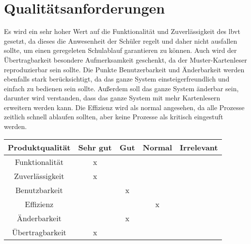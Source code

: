 \section{Qualitätsanforderungen}
Es wird ein sehr hoher Wert auf die Funktionalität und Zuverlässigkeit des \gls{lbvt} gesetzt, da dieses die Anwesenheit der Schüler regelt und daher nicht ausfallen sollte, um einen geregeleten Schulablauf garantieren zu können. Auch wird der Übertragbarkeit besondere Aufmerksamkeit geschenkt, da der Muster-Kartenleser reproduzierbar sein sollte. Die Punkte Benutzerbarkeit und Änderbarkeit werden ebenfalls stark berücksichtigt, da das ganze System einsteigerfreundlich und einfach zu bedienen sein sollte. Außerdem soll das ganze System änderbar sein, darunter wird verstanden, dass das ganze System mit mehr Kartenlesern erweitern werden kann. Die Effizienz wird als normal angesehen, da alle Prozesse zeitlich schnell ablaufen sollten, aber keine Prozesse als kritisch eingestuft werden. 

\begin{center}

\begin{tabular}{|c|c|c|c|c|}

\hline
    \rowcolor{gray} \textbf{\color{white}Produktqualität}&\textbf{\color{white}Sehr gut}&\textbf{\color{white}Gut}&\textbf{\color{white}Normal}&\textbf{\color{white}Irrelevant} \\
     \hline 
     Funktionalität&x&&&\\
     \hline
     Zuverlässigkeit&x&&&\\
     \hline
     Benutzbarkeit&&x&&\\
     \hline
     Effizienz&&&x&\\
     \hline
     Änderbarkeit&&x&&\\
     \hline
     Übertragbarkeit&x&&&\\
\hline
\end{tabular}
\end{center}




